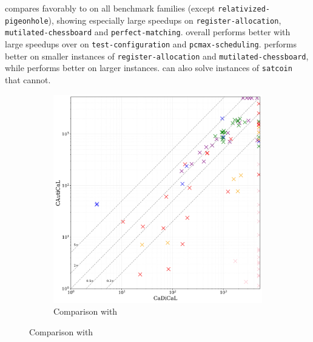 \tool compares favorably to \cadical on all benchmark families (except
\texttt{relativized-pigeonhole}), showing especially large speedups on
\texttt{register-allocation}, \texttt{mutilated-chessboard} and
\texttt{perfect-matching}. \prelearn overall performs better with large speedups
over \tool on \texttt{test-configuration} and \texttt{pcmax-scheduling}. \tool
performs better on smaller instances of \texttt{register-allocation} and
\texttt{mutilated-chessboard}, while \prelearn performs better on larger
instances. \tool can also solve instances of \texttt{satcoin} that
\prelearn cannot.


\begin{figure}[!t]
    \centering
    \begin{subfigure}[t]{0.45\textwidth}
            \centering
            \includegraphics[width=\textwidth]{figs/cadical_vs_cautical_interesting.jpg}
            \caption{Comparison with \cadical}
            \label{fig:cautical-vs-cadical}
    \end{subfigure}

\end{figure}
